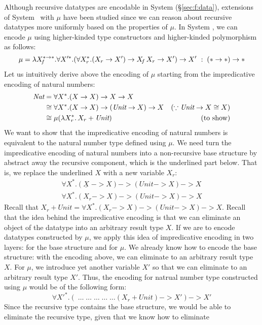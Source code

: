 Although recursive datatypes are encodable in System \F (\S\ref{sec:f:data}),
extensions of System \F\ with $\mu$ have been studied %
since we can reason about recursive datatypes more uniformly based on
the properties of $\mu$. In System \Fw, we can encode $\mu$ using
higher-kinded type constructors and higher-kinded polymorphism as follows:
\[
\mu =
 \lambda X_{\!f}^{* -> *}.
 \forall X'^{*}.(\forall X_r^{*}.(X_r -> X') -> X_{\!f}\,X_r -> X') -> X'
 ~:\; (* -> *) -> *
\]
Let us intuitively derive above the encoding of $\mu$ starting from
the impredicative encoding of natural numbers:
\begin{align*}
\textit{Nat}
	&= \forall X^{*} . (X -> X) -> X -> X \\
	&\cong \forall X^{*} . (X -> X) -> (\textit{Unit} -> X) -> X 
		&(\because \textit{Unit} -> X \cong X) \\
	&\cong \mu(\lambda X_r^{*}.\,X_r + \textit{Unit})
		& (\text{to show})
\end{align*}
We want to show that the impredicative encoding of natural numbers is
equivalent to the natural number type defined using $\mu$. We need turn
the impredicative encoding of natural numbers into a non-recursive
base structure by abstract away the recursive component, which is
the underlined part below. That is, we replace the underlined $X$
with a new variable $X_r$:
\begin{align*}
\forall X^{*} . (\underline{X}\; -> X) -> (\textit{Unit} -> X) -> X \\
\forall X^{*} . (X_r -> X) -> (\textit{Unit} -> X) -> X
\end{align*}
Recall that
$X_r +\textit{Unit} = \forall X^{*} . (X_r -> X) -> (\textit{Unit} -> X) -> X$.
Recall that the idea behind the impredicative encoding is that we can eliminate
an object of the datatype into an arbitrary result type $X$. If we are to
encode datatypes constructed by $\mu$, we apply this idea of
impredicative encoding in two layers: for the base structure and for $\mu$.
We already know how to encode the base structure: with the encoding above,
we can eliminate to an arbitrary result type $X$. For $\mu$, we introduce
yet another variable $X'$ so that we can eliminate to an arbitrary result
type $X'$. Thus, the encoding for natrual number type constructed using $\mu$
would be of the following form:
\[ \forall X'^{*}.(\;\dots\;\dots\;\dots\;\dots\;\dots (X_r + \textit{Unit}) -> X') -> X' \]
Since the recursive type contains the base structure, we would be able to
eliminate the recursive type, given that we know how to eliminate
